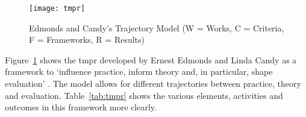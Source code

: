 


\begin{figure}[!htbp] %
  \centering
  \texttt{[image: tmpr]}
  \caption[Trajectory Model]{Edmonds and Candy's Trajectory Model (W = Works, C = Criteria, F = Frameworks, R = Results)}
\label{fig:tmpr}
\end{figure}

Figure~\ref{fig:tmpr} shows the \gls{tmpr} developed by Ernest Edmonds and Linda Candy as a framework to `influence practice, inform theory and, in particular, shape evaluation' \autocite{Edmonds2010}. The model allows for different trajectories between practice, theory and evaluation. Table~\ref{tab:tmpr} shows the various elements, activities and outcomes in this framework more clearly.

